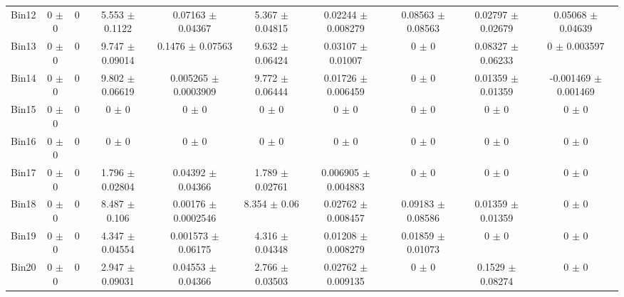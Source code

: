 \begin{tabular}{@{\extracolsep{4pt}}lccccccccc@{}}
     Bin12 & 0 $\pm$ 0 & 0 & 5.553 $\pm$ 0.1122 & 0.07163 $\pm$ 0.04367 & 5.367 $\pm$ 0.04815 & 0.02244 $\pm$ 0.008279 & 0.08563 $\pm$ 0.08563 & 0.02797 $\pm$ 0.02679 & 0.05068 $\pm$ 0.04639 \\ 
     Bin13 & 0 $\pm$ 0 & 0 & 9.747 $\pm$ 0.09014 & 0.1476 $\pm$ 0.07563 & 9.632 $\pm$ 0.06424 & 0.03107 $\pm$ 0.01007 & 0 $\pm$ 0 & 0.08327 $\pm$ 0.06233 & 0 $\pm$ 0.003597 \\ 
     Bin14 & 0 $\pm$ 0 & 0 & 9.802 $\pm$ 0.06619 & 0.005265 $\pm$ 0.0003909 & 9.772 $\pm$ 0.06444 & 0.01726 $\pm$ 0.006459 & 0 $\pm$ 0 & 0.01359 $\pm$ 0.01359 & -0.001469 $\pm$ 0.001469 \\ 
     Bin15 & 0 $\pm$ 0 & 0 & 0 $\pm$ 0 & 0 $\pm$ 0 & 0 $\pm$ 0 & 0 $\pm$ 0 & 0 $\pm$ 0 & 0 $\pm$ 0 & 0 $\pm$ 0 \\ 
     Bin16 & 0 $\pm$ 0 & 0 & 0 $\pm$ 0 & 0 $\pm$ 0 & 0 $\pm$ 0 & 0 $\pm$ 0 & 0 $\pm$ 0 & 0 $\pm$ 0 & 0 $\pm$ 0 \\ 
     Bin17 & 0 $\pm$ 0 & 0 & 1.796 $\pm$ 0.02804 & 0.04392 $\pm$ 0.04366 & 1.789 $\pm$ 0.02761 & 0.006905 $\pm$ 0.004883 & 0 $\pm$ 0 & 0 $\pm$ 0 & 0 $\pm$ 0 \\ 
     Bin18 & 0 $\pm$ 0 & 0 & 8.487 $\pm$ 0.106 & 0.00176 $\pm$ 0.0002546 & 8.354 $\pm$ 0.06 & 0.02762 $\pm$ 0.008457 & 0.09183 $\pm$ 0.08586 & 0.01359 $\pm$ 0.01359 & 0 $\pm$ 0 \\ 
     Bin19 & 0 $\pm$ 0 & 0 & 4.347 $\pm$ 0.04554 & 0.001573 $\pm$ 0.06175 & 4.316 $\pm$ 0.04348 & 0.01208 $\pm$ 0.008279 & 0.01859 $\pm$ 0.01073 & 0 $\pm$ 0 & 0 $\pm$ 0 \\ 
     Bin20 & 0 $\pm$ 0 & 0 & 2.947 $\pm$ 0.09031 & 0.04553 $\pm$ 0.04366 & 2.766 $\pm$ 0.03503 & 0.02762 $\pm$ 0.009135 & 0 $\pm$ 0 & 0.1529 $\pm$ 0.08274 & 0 $\pm$ 0 \\ 
\hline\hline
  \end{tabular}
